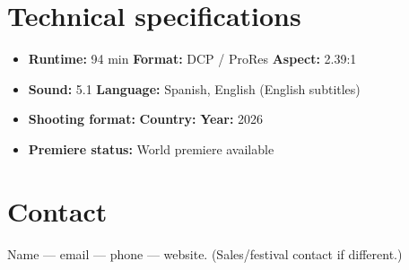 \documentclass[11pt,a4paper]{article}
\begin{document}
\section{Technical specifications}
\begin{itemize}[leftmargin=1.2em,nosep]
  \item \textbf{Runtime:} 94 min \quad \textbf{Format:} DCP / ProRes \quad \textbf{Aspect:} 2.39:1
  \item \textbf{Sound:} 5.1 \quad \textbf{Language:} Spanish, English (English subtitles)
  \item \textbf{Shooting format:} \quad \textbf{Country:} \quad \textbf{Year:} 2026
  \item \textbf{Premiere status:} World premiere available
\end{itemize}

\section{Contact}
Name --- email --- phone --- website. (Sales/festival contact if different.)
\end{document}
